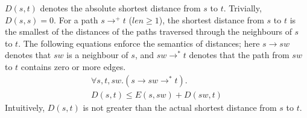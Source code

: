 $D(s,t)$ denotes the absolute shortest distance from $s$ to $t$. 
Trivially, $D(s,s) = 0$. For a path $s \rightarrow^+ t$ ($len \geq 1$),
the shortest distance from $s$ to $t$ is the smallest of the distances
of the paths traversed through the neighbours of $s$ to $t$. The
following equations enforce the semantics of distances; 
here $s \rightarrow sw$ denotes that $sw$ is a neighbour
of $s$, and $sw \rightarrow^* t$ denotes that the path from $sw$ to $t$ contains
zero or more edges.
\begin{multline} \label{eq:dist}
\forall s, t, sw. (s \rightarrow sw \rightarrow^* t).\\
D(s, t) \leq E(s, sw) + D(sw, t)
\end{multline}
Intuitively, $D(s,t)$ is not greater than 
the actual shortest distance from $s$ to $t$.

